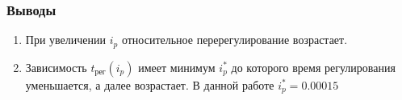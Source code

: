 \documentclass[a4paper,12pt]{article}
\begin{document}
\begin{enumerate}
                            
                \end{enumerate}
                \subsubsection{Выводы}
                \begin{enumerate}
                    \item При увеличении $i_p$ относительное перерегулирование  возрастает.
                    \item Зависимость $t_{\text{рег}}(i_p)$ имеет минимум $i^*_p$  до которого время регулирования уменьшается, а далее возрастает. В данной работе $i^*_p=0.00015$ 
                \end{enumerate}
\end{document}
